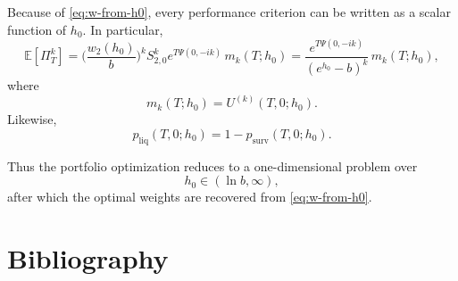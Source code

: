 \documentclass{article}
\newcommand{\E}{\mathbb{E}}
\theoremstyle{definition}
\begin{document}
Because of \eqref{eq:w-from-h0}, every performance criterion can be written as a scalar function of $h_0$.
In particular,
\[
\E[\Pi_T^k]
=
\Big(\frac{w_2(h_0)}{b}\Big)^k S_{2,0}^k e^{T\Psi(0,-ik)}\,m_k(T;h_0)
=
\frac{e^{T\Psi(0,-ik)}}{(e^{h_0}-b)^k}\,m_k(T;h_0),
\]
where
\[
m_k(T;h_0)=U^{(k)}(T,0;h_0).
\]
Likewise,
\[
p_{\mathrm{liq}}(T,0;h_0)=1-p_{\mathrm{surv}}(T,0;h_0).
\]

Thus the portfolio optimization reduces to a one-dimensional problem over
\[
h_0\in(\ln b,\infty),
\]
after which the optimal weights are recovered from \eqref{eq:w-from-h0}.

\section{Bibliography}


\end{document}
